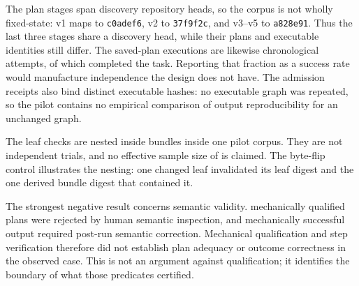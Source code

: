 \documentclass[11pt]{article}
\newcommand{\code}[1]{\texttt{#1}}
\begin{document}
The \QualifiedPlanCount{} plan stages span
\DistinctDiscoveryHeads{} discovery repository heads, so the corpus is not
wholly fixed-state: v1 maps to \code{c0adef6}, v2 to \code{37f9f2c}, and
v3--v5 to \code{a828e91}. Thus the last three stages share a discovery head,
while their plans and executable identities still differ. The
\ExecutionCount{} saved-plan
executions are likewise chronological attempts, of which
\ExecutionSuccessCount{} completed the task.  Reporting that fraction as a
success rate would manufacture independence the design does not have.  The
\ExecutionCount{} admission receipts also bind \ExecutionCount{} distinct
executable hashes: no
executable graph was repeated, so the pilot contains no empirical comparison
of output reproducibility for an unchanged graph.

The \ManifestFileCount{} leaf checks are nested inside
\ManifestBundleCount{} bundles inside one pilot corpus. They are not
\ManifestFileCount{} independent trials, and no effective sample size of
\ManifestFileCount{} is claimed. The byte-flip control illustrates the
nesting: one changed leaf invalidated its leaf digest and the one derived
bundle digest that contained it.

The strongest negative result concerns semantic validity.
\SemanticPlanRejections{} mechanically qualified plans were rejected by human
semantic inspection, and \PostRunCorrectionCount{} mechanically successful
output required post-run semantic correction.  Mechanical qualification and
step verification therefore did not establish plan adequacy or outcome
correctness in the observed case. This is not an argument against
qualification; it identifies the boundary of what those predicates certified.
\end{document}
